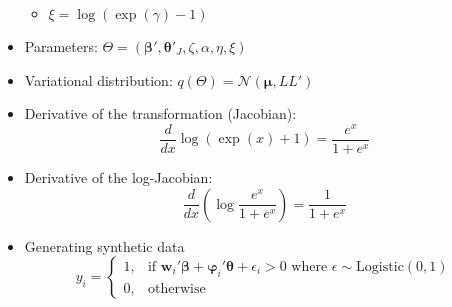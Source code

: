 \documentclass[review]{elsarticle}
\begin{document}
\begin{itemize}
\begin{itemize}
    \item $\xi = \log(\exp(\gamma)-1)$
  \end{itemize}
  \item Parameters: $\Theta = \left(\bm{\beta}',\bm{\theta}'_{J},\zeta,\alpha,\eta,\xi\right)$
  \item Variational distribution: $q(\Theta)=\mathcal{N}(\bm{\mu},LL')$
  \item Derivative of the transformation (Jacobian):
  \begin{equation}
    \dfrac{d}{dx}\log(\exp(x)+1) = \dfrac{e^{x}}{1+e^{x}}
  \end{equation}
  \item Derivative of the log-Jacobian:
  \begin{equation}
  \dfrac{d}{dx}\left(\log\dfrac{e^{x}}{1+e^{x}}\right)=\dfrac{1}{1+e^{x}}
  \end{equation}
  \item Generating synthetic data
  \begin{equation}
    y_{i} = \begin{cases}1, & \text{if $\mathbf{w}_{i}'\bm{\beta}+\bm{\varphi}_{i}'\bm{\theta}+\epsilon_{i} > 0$ where $\epsilon\sim\mathrm{Logistic}(0,1)$}\\ 0, & \text{otherwise}\end{cases}
  \end{equation}
\end{itemize}
\end{document}
